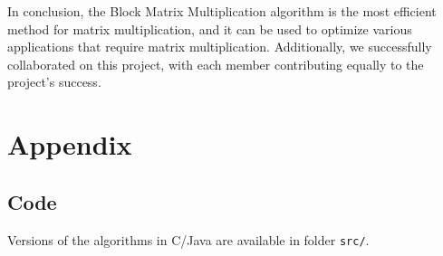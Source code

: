 \documentclass[11pt,a4paper]{article}
\begin{document}
In conclusion, the Block Matrix Multiplication algorithm is the most efficient method for matrix multiplication, and it can be used to optimize various applications that require matrix multiplication. Additionally, we successfully collaborated on this project, with each member contributing equally to the project's success.

\appendix
\section{Appendix}

\subsection{Code}

\noindent Versions of the algorithms in C/Java are available in folder \lstinline{src/}.

\printindex
\end{document}
